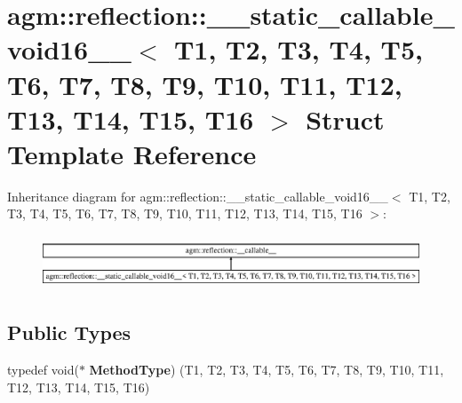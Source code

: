 \hypertarget{structagm_1_1reflection_1_1____static__callable__void16____}{}\section{agm\+:\+:reflection\+:\+:\+\_\+\+\_\+static\+\_\+callable\+\_\+void16\+\_\+\+\_\+$<$ T1, T2, T3, T4, T5, T6, T7, T8, T9, T10, T11, T12, T13, T14, T15, T16 $>$ Struct Template Reference}
\label{structagm_1_1reflection_1_1____static__callable__void16____}
Inheritance diagram for agm\+:\+:reflection\+:\+:\+\_\+\+\_\+static\+\_\+callable\+\_\+void16\+\_\+\+\_\+$<$ T1, T2, T3, T4, T5, T6, T7, T8, T9, T10, T11, T12, T13, T14, T15, T16 $>$\+:\begin{figure}[H]
\begin{center}
\leavevmode
\includegraphics[height=1.616162cm]{structagm_1_1reflection_1_1____static__callable__void16____}
\end{center}
\end{figure}
\subsection*{Public Types}
\begin{DoxyCompactItemize}
\item 
typedef void($\ast$ {\bfseries Method\+Type}) (T1, T2, T3, T4, T5, T6, T7, T8, T9, T10, T11, T12, T13, T14, T15, T16)\hypertarget{structagm_1_1reflection_1_1____static__callable__void16_____a74a10ea44ef5aeee1fa747f74f110e60}{}\label{structagm_1_1reflection_1_1____static__callable__void16_____a74a10ea44ef5aeee1fa747f74f110e60}

\end{DoxyCompactItemize}
